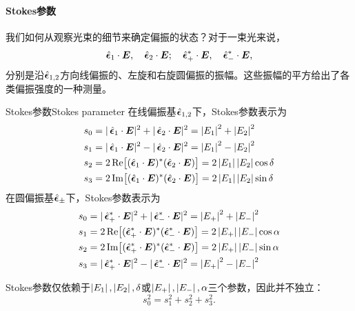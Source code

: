 \paragraph{Stokes参数}
我们如何从观察光束的细节来确定偏振的状态？对于一束光来说，
\[
    \mathop{}\!\hat{\bm{\epsilon}}_1\cdot\bm E,\quad\mathop{}\!\hat{\bm{\epsilon}}_2\cdot\bm E;\quad\mathop{}\!\hat{\bm{\epsilon}}_+^\ast\cdot\bm E,\quad\mathop{}\!\hat{\bm{\epsilon}}_-^\ast\cdot\bm E,
\]
分别是沿$\mathop{}\!\hat{\bm{\epsilon}}_{1,2}$方向线偏振的、左旋和右旋圆偏振的振幅。这些振幅的平方给出了各类偏振强度的一种测量。%

\begin{definition}
    {Stokes参数}{Stokes parameter}
    在线偏振基$\mathop{}\!\hat{\bm{\epsilon}}_{1,2}$下，Stokes参数表示为
    \begin{subequations}
        \begin{align}
            s_0&=|\uvec\epsilon_1\cdot\bm E|^2+|\uvec\epsilon_2\cdot\bm E|^2=\abs{E_1}^2+\abs{E_2}^2\\
            s_1&=|\uvec\epsilon_1\cdot\bm E|^2-|\uvec\epsilon_2\cdot\bm E|^2=\abs{E_1}^2-\abs{E_2}^2\\
            s_2&=2\Re\bigfkh{(\uvec\epsilon_1\cdot\bm E)\cj(\uvec\epsilon_2\cdot\bm E)}=2\abs{E_1}\abs{E_2}\cos\delta\\
            s_3&=2\Im\bigfkh{(\uvec\epsilon_1\cdot\bm E)\cj(\uvec\epsilon_2\cdot\bm E)}=2\abs{E_1}\abs{E_2}\sin\delta
        \end{align}
    \end{subequations}
    在圆偏振基$\mathop{}\!\hat{\bm{\epsilon}}_\pm$下，Stokes参数表示为
    \begin{subequations}
        \begin{align}
            s_0&=|\uvec\epsilon_+\cj\cdot\bm E|^2+|\uvec\epsilon_-\cj\cdot\bm E|^2=\abs{E_+}^2+\abs{E_-}^2\\
            s_1&=2\Re\bigfkh{(\uvec\epsilon_+\cj\cdot\bm E)\cj(\uvec\epsilon_-\cj\cdot\bm E)}=2\abs{E_+}\abs{E_-}\cos\alpha\\
            s_2&=2\Im\bigfkh{(\uvec\epsilon_+\cj\cdot\bm E)\cj(\uvec\epsilon_-\cj\cdot\bm E)}=2\abs{E_+}\abs{E_-}\sin\alpha\\
            s_3&=|\uvec\epsilon_+\cj\cdot\bm E|^2-|\uvec\epsilon_-\cj\cdot\bm E|^2=\abs{E_+}^2-\abs{E_-}^2
        \end{align}
    \end{subequations}
\end{definition}
\begin{corollary}
    Stokes参数仅依赖于$\left\lvert E_1\right\rvert,\left\lvert E_2\right\rvert,\delta$或$\left\lvert E_+\right\rvert,\left\lvert E_-\right\rvert,\alpha$三个参数，因此并不独立：
    \[
        s_0^2=s_1^2+s_2^2+s_3^2.
    \]
\end{corollary}

